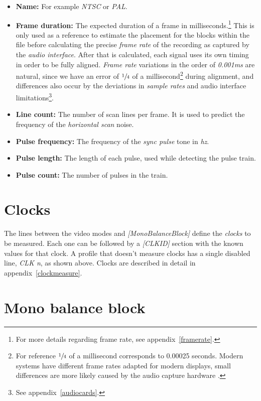 \documentclass[10pt,a4paper]{report}
\newcommand{\ac}[1]{\textit{\mbox{\acrshort{#1}}}}
\begin{document}
\begin{appendices}
\begin{itemize}
	\item \textbf{Name:} For example \textit{NTSC} or \textit{PAL}.
	\item \textbf{Frame duration:} The expected duration of a frame in milliseconds.\footnote{For more details regarding frame rate, see appendix~\ref{framerate}.} This is only used as a reference to estimate the placement for the blocks within the file before calculating the precise \textit{frame rate} of the recording as captured by the \textit{audio interface}. After that is calculated, each signal uses its own timing in order to be fully aligned. \textit{Frame rate} variations in the order of \textit{0.001}\ac{ms} are natural, since we have an error of $\sfrac{1}{4}$ of a millisecond\footnote{For reference $\sfrac{1}{4}$ of a millisecond corresponds to 0.00025 seconds. Modern systems have different frame rates adapted for modern displays, small differences are more likely caused by the audio capture hardware \cite{SoundCardClock}.} during alignment, and differences also occur by the deviations in \textit{sample rates} and audio interface limitations\footnote{See appendix~\ref{audiocards}.}.
	\item \textbf{Line count:} The number of scan lines per frame. It is used to predict the frequency of the \textit{horizontal scan} noise.
	\item \textbf{Pulse frequency:} The frequency of the \textit{sync pulse} tone in \ac{hz}.
	\item \textbf{Pulse length:} The length of each pulse, used while detecting the pulse train.
	\item \textbf{Pulse count:} The number of pulses in the train.
\end{itemize}

\section{Clocks}

The lines between the video modes and \textit{[MonoBalanceBlock]} define the \textit{clocks} to be measured. Each one can be followed by a \textit{[CLKID]} section with the known values for that clock. A profile that doesn't measure clocks has a single disabled line, \textit{CLK n}, as shown above. Clocks are described in detail in appendix~\ref{clockmeasure}.

\section{Mono balance block}


\end{appendices}
\end{document}
